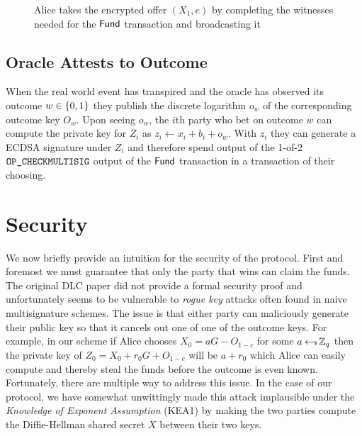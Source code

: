 \documentclass[runningheads]{llncs}
\begin{document}
\begin{figure}[!h]
  \centering
    \caption{Alice takes the encrypted offer $(X_1, e)$ by completing the witnesses needed for the $\textsf{Fund}$ transaction and broadcasting it}\label{fig:takeoffer}
  \end{figure}

\subsection{Oracle Attests to Outcome}

When the real world event has transpired and the oracle has observed its outcome $w \in \{0,1\}$ they publish the discrete logarithm $o_w$ of the corresponding outcome key $O_w$. Upon seeing $o_w$, the $i$th party who bet on outcome $w$ can compute the private key for $Z_i$ as $z_i \gets x_i + b_i + o_w$. With $z_i$ they can generate a ECDSA signature under $Z_i$ and therefore spend output of the 1-of-2 $\texttt{OP\_CHECKMULTISIG}$ output of the $\textsf{Fund}$ transaction in a transaction of their choosing.

\section{Security}

We now briefly provide an intuition for the security of the protocol. First and foremost we must guarantee that only the party that wins can claim the funds. The original DLC paper\cite{DLC} did not provide a formal security proof and unfortunately seems to be vulnerable to \emph{rogue key} attacks often found in naive multisignature schemes\cite{musig}. The issue is that either party can maliciously generate their public key so that it cancels out one of one of the outcome keys. For example, in our scheme if Alice chooses $X_0 = aG - O_{1-c}$ for some $a \hskip2.3pt{\gets\!\!\mbox{\tiny${\$}$\normalsize}}\, \mathbb{Z}_q$ then the private key of $Z_0 = X_0 + r_0G + O_{1-c}$ will be $a + r_0$ which Alice can easily compute and thereby steal the funds before the outcome is even known. Fortunately, there are multiple way to address this issue. In the case of our protocol, we have somewhat unwittingly made this attack implausible under the \emph{Knowledge of Exponent Assumption} (KEA1) \cite{KEA} by making the two parties compute the Diffie-Hellman shared secret $X$ between their two keys.
\end{document}
